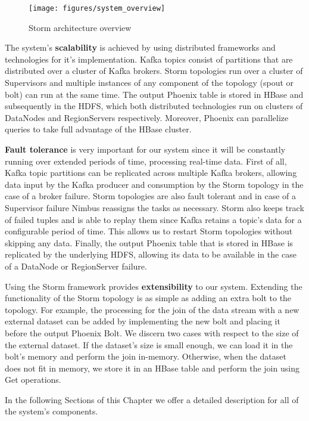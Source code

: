 \begin{figure}[H]
\centering
\texttt{[image: figures/system\_overview]}
\caption{Storm architecture overview}
\label{figure:system_overview}
\end{figure}

The system's \textbf{scalability} is achieved by using distributed frameworks and technologies for it's implementation. Kafka topics consist of partitions that are distributed over a cluster of Kafka brokers. Storm topologies run over a cluster of Supervisors and multiple instances of any component of the topology (spout or bolt) can run at the same time. The output Phoenix table is stored in HBase and subsequently in the HDFS, which both distributed technologies run on clusters of DataNodes and RegionServers respectively. Moreover, Phoenix can parallelize queries to take full advantage of the HBase cluster.

\textbf{Fault tolerance} is very important for our system since it will be constantly running over extended periods of time, processing real-time data. First of all, Kafka topic partitions can be replicated across multiple Kafka brokers, allowing data input by the Kafka producer and consumption by the Storm topology in the case of a broker failure. Storm topologies are also fault tolerant and in case of a Supervisor failure Nimbus reassigns the tasks as necessary. Storm also keeps track of failed tuples and is able to replay them since Kafka retains a topic's data for a configurable period of time. This allows us to restart Storm topologies without skipping any data. Finally, the output Phoenix table that is stored in HBase is replicated by the underlying HDFS, allowing its data to be available in the case of a DataNode or RegionServer failure.

Using the Storm framework provides \textbf{extensibility} to our system. Extending the functionality of the Storm topology is as simple as adding an extra bolt to the topology. For example, the processing for the join of the data stream with a new external dataset can be added by implementing the new bolt and placing it before the output Phoenix Bolt. We discern two cases with respect to the size of the external dataset. If the dataset's size is small enough, we can load it in the bolt's memory and perform the join in-memory. Otherwise, when the dataset does not fit in memory, we store it in an HBase table and perform the join using Get operations.

In the following Sections of this Chapter we offer a detailed description for all of the system's components.


